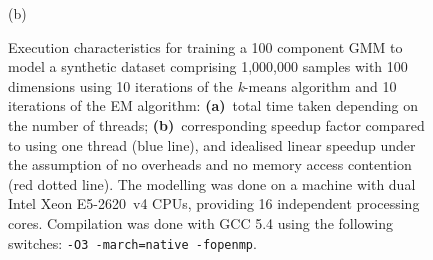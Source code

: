 \begin{figure}[!h]
\begin{minipage}{1\columnwidth}
\begin{minipage}{0.5\textwidth}
    {(b)}
  \end{minipage}
\end{minipage}
\caption
  {
  Execution characteristics for training a 100 component GMM
  to model a synthetic dataset comprising 1,000,000 samples with 100 dimensions
  using 10 iterations of the {\it k}-means algorithm and 10 iterations of the EM algorithm:
  {\bf (a)}~total time taken depending on the number of threads;
  {\bf (b)}~corresponding speedup factor compared to using one thread (blue line), and idealised linear speedup under the assumption of no overheads and no memory access contention (red dotted line).
  The modelling was done on a machine with dual Intel Xeon E5-2620~v4 CPUs, providing 16 independent processing cores.
  Compilation was done with GCC 5.4 using the following switches: \texttt{-O3 -march=native -fopenmp}.
  }
\label{fig:speedup}
\end{figure}



% 
% 
%   
%   
%   
%   
%   
%   
%   
%   
%   
%   
%   
%   
%   
%   
%   
%   
